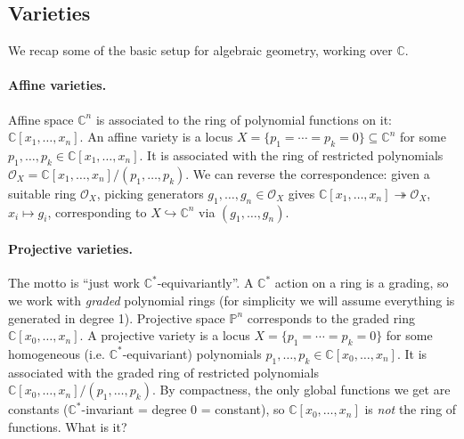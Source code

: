 \documentclass{article}
\theoremstyle{definition}
\renewcommand{\O}{\mathcal{O}}
\renewcommand{\P}{\mathbb{P}}
\newcommand{\C}{\mathbb{C}}
\begin{document}
\subsection*{Varieties}

We recap some of the basic setup for algebraic geometry, working over $\C$.

\paragraph{Affine varieties.} Affine space $\C^n$ is associated to the ring of
polynomial functions on it: $\C[x_1,\ldots,x_n]$. An affine variety is
a locus $X=\{p_1=\cdots=p_k=0\}\subseteq\C^n$ for some
$p_1,\ldots,p_k\in\C[x_1,\ldots,x_n]$. It is associated with the ring of
restricted polynomials $\O_X=\C[x_1,\ldots,x_n]/(p_1,\ldots,p_k)$.
We can reverse the correspondence: given a suitable ring $\O_X$, picking
generators $g_1,\ldots,g_n\in\O_X$ gives
$\C[x_1,\ldots,x_n]\twoheadrightarrow\O_X$, $x_i\mapsto g_i$, corresponding to
$X\hookrightarrow\C^n$ via $(g_1,\ldots,g_n)$.

\paragraph{Projective varieties.} The motto is ``just work
$\C^*$-equivariantly''. A $\C^*$ action on a ring is a grading, so we work with
\emph{graded} polynomial rings (for simplicity we will assume everything is
generated in degree 1). Projective space $\P^n$ corresponds to the graded ring
$\C[x_0,\ldots,x_n]$. A projective variety is a locus $X=\{p_1=\cdots=p_k=0\}$
for some homogeneous (i.e. $\C^*$-equivariant) polynomials
$p_1,\ldots,p_k\in\C[x_0,\ldots,x_n]$. It is associated with the graded ring of
restricted polynomials $\C[x_0,\ldots,x_n]/(p_1,\ldots,p_k)$. By compactness,
the only global functions we get are constants ($\C^*$-invariant = degree 0 =
constant), so $\C[x_0,\ldots,x_n]$ is \emph{not} the ring of functions. What is
it?
\end{document}
